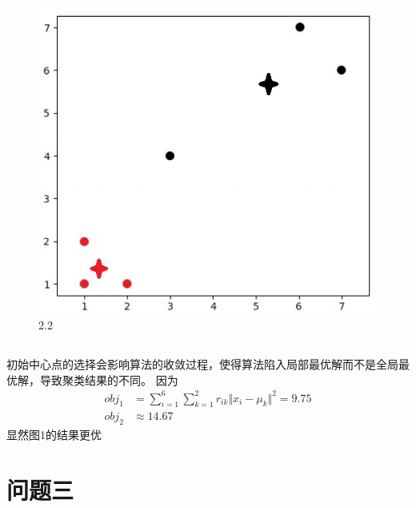 \documentclass[12pt, a4paper]{article}
\begin{document}
\begin{figure}
    \centering
    \includegraphics*[scale=0.8]{img/a5_3.jpg}
    \caption{2.2}
\end{figure}

\subsection{}

初始中心点的选择会影响算法的收敛过程，使得算法陷入局部最优解而不是全局最优解，导致聚类结果的不同。
因为
\begin{align*}
    obj_1&=\sum_{i=1}^6\sum_{k=1}^2r_{ik}\Vert x_i-\mu_k \Vert^2=9.75\\
    obj_2&\approx 14.67
\end{align*}
显然图1的结果更优


\section{问题三}
\end{document}
